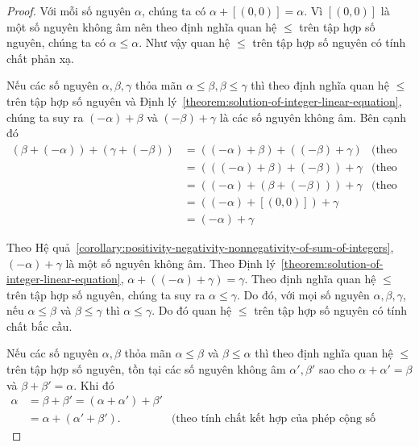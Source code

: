 \begin{proof}
	Với mỗi số nguyên $\alpha$, chúng ta có $\alpha + [(0,0)] = \alpha$. Vì $[(0,0)]$ là một số nguyên không âm nên theo định nghĩa quan hệ $\leq$ trên tập hợp số nguyên, chúng ta có $\alpha\leq \alpha$. Như vậy quan hệ $\leq$ trên tập hợp số nguyên có tính chất phản xạ.

	Nếu các số nguyên $\alpha, \beta, \gamma$ thỏa mãn $\alpha\leq \beta, \beta\leq\gamma$ thì theo định nghĩa quan hệ $\leq$ trên tập hợp số nguyên và Định lý~\ref{theorem:solution-of-integer-linear-equation}, chúng ta suy ra $(-\alpha) + \beta$ và $(-\beta) + \gamma$ là các số nguyên không âm. Bên cạnh đó
	\begin{align*}
		(\beta + (-\alpha)) + (\gamma + (-\beta)) & = ((-\alpha) + \beta) + ((-\beta) + \gamma) & \text{(theo tính chất giao hoán của phép cộng số nguyên)} \\
		                                          & = (((-\alpha) + \beta) + (-\beta)) + \gamma & \text{(theo tính chất kết hợp của phép cộng số nguyên)}   \\
		                                          & = ((-\alpha) + (\beta + (-\beta))) + \gamma & \text{(theo tính chất kết hợp của phép cộng số nguyên)}   \\
		                                          & = ((-\alpha) + [(0,0)]) + \gamma                                                                        \\
		                                          & = (-\alpha) + \gamma
	\end{align*}

	Theo Hệ quả~\ref{corollary:positivity-negativity-nonnegativity-of-sum-of-integers}, $(-\alpha) + \gamma$ là một số nguyên không âm. Theo Định lý~\ref{theorem:solution-of-integer-linear-equation}, $\alpha + ((-\alpha) + \gamma) = \gamma$. Theo định nghĩa quan hệ $\leq$ trên tập hợp số nguyên, chúng ta suy ra $\alpha\leq\gamma$. Do đó, với mọi số nguyên $\alpha,\beta,\gamma$, nếu $\alpha\leq\beta$ và $\beta\leq\gamma$ thì $\alpha\leq\gamma$. Do đó quan hệ $\leq$ trên tập hợp số nguyên có tính chất bắc cầu.

	Nếu các số nguyên $\alpha, \beta$ thỏa mãn $\alpha\leq\beta$ và $\beta\leq\alpha$ thì theo định nghĩa quan hệ $\leq$ trên tập hợp số nguyên, tồn tại các số nguyên không âm $\alpha', \beta'$ sao cho $\alpha + \alpha' = \beta$ và $\beta + \beta' = \alpha$. Khi đó
	\begin{align*}
		\alpha & = \beta + \beta' = (\alpha + \alpha') + \beta'                                                           \\
		       & = \alpha + (\alpha' + \beta').                 & \text{(theo tính chất kết hợp của phép cộng số nguyên)}
	\end{align*}


\end{proof}
